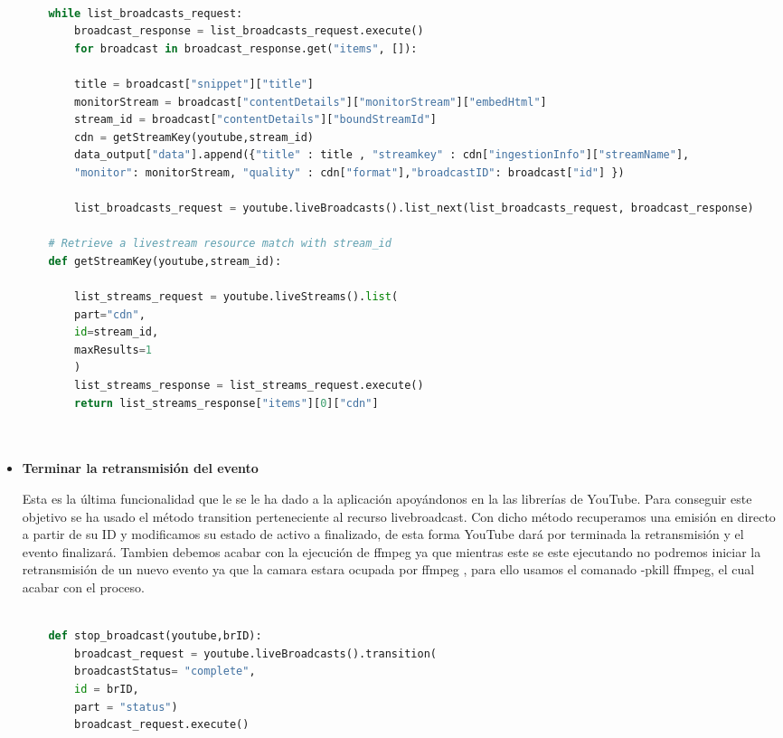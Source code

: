 \begin{itemize}
    \begin{lstlisting}[language =Python]
    
    while list_broadcasts_request:
        broadcast_response = list_broadcasts_request.execute()
        for broadcast in broadcast_response.get("items", []):
    
        title = broadcast["snippet"]["title"]
        monitorStream = broadcast["contentDetails"]["monitorStream"]["embedHtml"]
        stream_id = broadcast["contentDetails"]["boundStreamId"]
        cdn = getStreamKey(youtube,stream_id)
        data_output["data"].append({"title" : title , "streamkey" : cdn["ingestionInfo"]["streamName"],
        "monitor": monitorStream, "quality" : cdn["format"],"broadcastID": broadcast["id"] })

        list_broadcasts_request = youtube.liveBroadcasts().list_next(list_broadcasts_request, broadcast_response)
    
    # Retrieve a livestream resource match with stream_id
    def getStreamKey(youtube,stream_id):
    
        list_streams_request = youtube.liveStreams().list(
        part="cdn",
        id=stream_id,
        maxResults=1
        )
        list_streams_response = list_streams_request.execute()
        return list_streams_response["items"][0]["cdn"]

    
    \end{lstlisting}
    
    \item \textbf{Terminar la retransmisión del evento}
    
    Esta es la última funcionalidad que le se le ha dado a la aplicación apoyándonos en la las librerías de YouTube. Para conseguir este objetivo se ha usado el método transition perteneciente al recurso livebroadcast. Con dicho método recuperamos una emisión en directo a partir de su ID y modificamos su estado de activo a finalizado, de esta forma YouTube dará por terminada la retransmisión y el evento finalizará. Tambien debemos acabar con la ejecución de ffmpeg ya que mientras este se este ejecutando no podremos iniciar la retransmisión de un nuevo evento ya que la camara estara ocupada por ffmpeg , para ello usamos el comanado -pkill ffmpeg, el cual acabar con el proceso.
    \\
    
    \begin{lstlisting}[language = Python]
    
    def stop_broadcast(youtube,brID):
    	broadcast_request = youtube.liveBroadcasts().transition(
        broadcastStatus= "complete",
        id = brID,
        part = "status")
    	broadcast_request.execute()
    

\end{lstlisting}
\end{itemize}
